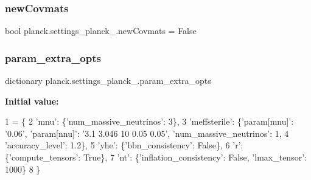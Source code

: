 \mbox{\label{namespaceplanck_1_1settings__planck__2015_af9b6eaa43eb2ad83e2cc3f95114937d9}} 
\subsubsection{\texorpdfstring{new\+Covmats}{newCovmats}}
{\footnotesize\ttfamily bool planck.\+settings\+\_\+planck\+\_.\+new\+Covmats = False}

\mbox{\label{namespaceplanck_1_1settings__planck__2015_ab9d437ebeb1d7fef001d7a985b9e4892}} 
\subsubsection{\texorpdfstring{param\+\_\+extra\+\_\+opts}{param\_extra\_opts}}
{\footnotesize\ttfamily dictionary planck.\+settings\+\_\+planck\+\_.\+param\+\_\+extra\+\_\+opts}

{\bfseries Initial value\+:}
\begin{DoxyCode}
1 =  \{
2     \textcolor{stringliteral}{'mnu'}: \{\textcolor{stringliteral}{'num\_massive\_neutrinos'}: 3\},
3     \textcolor{stringliteral}{'meffsterile'}: \{\textcolor{stringliteral}{'param[mnu]'}: \textcolor{stringliteral}{'0.06'}, \textcolor{stringliteral}{'param[nnu]'}: \textcolor{stringliteral}{'3.1 3.046 10 0.05 0.05'}, \textcolor{stringliteral}{'num\_massive\_neutrinos'}: 
      1,
4                     \textcolor{stringliteral}{'accuracy\_level'}: 1.2\},
5     \textcolor{stringliteral}{'yhe'}: \{\textcolor{stringliteral}{'bbn\_consistency'}: \textcolor{keyword}{False}\},
6     \textcolor{stringliteral}{'r': \{'}compute\_tensors': True\},
7     \textcolor{stringliteral}{'nt'}: \{\textcolor{stringliteral}{'inflation\_consistency'}: \textcolor{keyword}{False}, \textcolor{stringliteral}{'lmax\_tensor'}: 1000\}
8 \}
\end{DoxyCode}
\mbox{\label{namespaceplanck_1_1settings__planck__2015_aae27dbb32454bc4c258508d3a36861ce}} 
